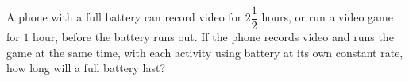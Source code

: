 A phone with a full battery can record video for $2\dfrac{1}{2}$ hours, or run a video game for $1$ hour, before the battery runs out. If the phone records video and runs the game at the same time, with each activity using battery at its own constant rate, how long will a full battery last?
